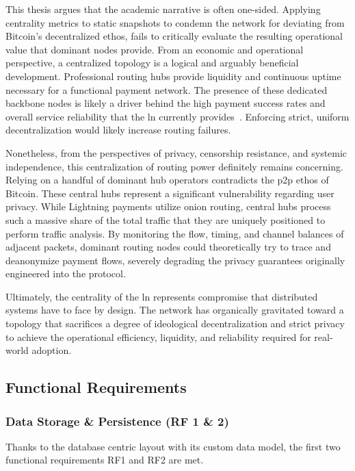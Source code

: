 This thesis argues that the academic narrative is often one-sided. 
Applying centrality metrics to static snapshots to condemn the network for deviating from Bitcoin's decentralized ethos,
fails to critically evaluate the resulting operational value that dominant nodes provide.
From an economic and operational perspective, a centralized topology is a logical and arguably beneficial development. 
Professional routing hubs provide liquidity and continuous uptime necessary for a functional payment network. 
The presence of these dedicated backbone nodes is likely a driver behind the 
high payment success rates and overall service reliability that the \gls{ln} currently provides~\cite{random__reran_2024}.
Enforcing strict, uniform decentralization would likely increase routing failures.

Nonetheless, from the perspectives of privacy, censorship resistance, and systemic independence, 
this centralization of routing power definitely remains concerning. 
Relying on a handful of dominant hub operators contradicts the \gls{p2p} ethos of Bitcoin. 
These central hubs represent a significant vulnerability regarding user privacy. 
While Lightning payments utilize onion routing, central hubs process such a massive share of the total traffic 
that they are uniquely positioned to perform traffic analysis. 
By monitoring the flow, timing, and channel balances of adjacent packets, 
dominant routing nodes could theoretically try to trace and deanonymize payment flows, 
severely degrading the privacy guarantees originally engineered into the protocol.

Ultimately, the centrality of the \gls{ln} represents compromise that distributed systems have to face by design. 
The network has organically gravitated toward a topology that sacrifices a degree of ideological decentralization and 
strict privacy to achieve the operational efficiency, liquidity, and reliability required for real-world adoption.

\iffalse
\subsection{Functional Requirements}

\subsubsection{Data Storage \& Persistence (RF 1 \& 2)}
Thanks to the database centric layout with its custom data model,
the first two functional requirements RF1 and RF2 are met.


